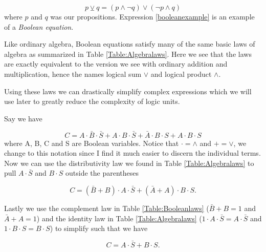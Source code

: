             \begin{equation}
                \label{booleanexample}
                p \veebar q = (p \wedge \neg q) \vee (\neg p \wedge q)
            \end{equation}
            where $p$ and $q$ was our propositions. Expression \ref{booleanexample} is an example of a \textit{Boolean equation}. 
            
            Like ordinary algebra, Boolean equations satisfy many of the same basic laws of algebra as summarized in Table \ref{Table:Algebralaws}. Here we see that the laws are exactly equivalent to the version we see with ordinary addition and multiplication, hence the names logical sum $\vee$ and logical product $\wedge$.
            
            Using these laws we can drastically simplify complex expressions which we will use later to greatly reduce the complexity of logic units. 
            
            Say we have 
            
            \begin{equation}
               \label{simplify}
                C = A \cdot \bar{B} \cdot \bar{S} + A \cdot B \cdot \bar{S} + \bar{A} \cdot B \cdot S
                  + A \cdot B \cdot S
            \end{equation}
            where A, B, C and S are Boolean variables. Notice that $\cdot = \wedge$ and $+ = \vee$, we change to this notation since I find it much easier to discern the individual terms. Now we can use the distributivity law we found in Table \ref{Table:Algebralaws} to pull $A\cdot \bar{S}$ and $B \cdot S$ outside the parentheses
            
            \begin{equation}
                C = (\bar{B} + B) \cdot A\cdot \bar{S} + (\bar{A} + A)\cdot B\cdot S.
            \end{equation}
            
            Lastly we use the complement law in Table \ref{Table:Booleanlaws} ($\bar{B} + B = 1$ and $\bar{A} + A = 1$) and the identity law in Table \ref{Table:Algebralaws} ($1 \cdot A\cdot \bar{S} = A\cdot \bar{S}$ and $1 \cdot B\cdot S = B\cdot S$) to simplify such that we have
            
            \begin{equation}
                \label{simplify2}
                C = A\cdot \bar{S} + B\cdot S.
            \end{equation}
            
